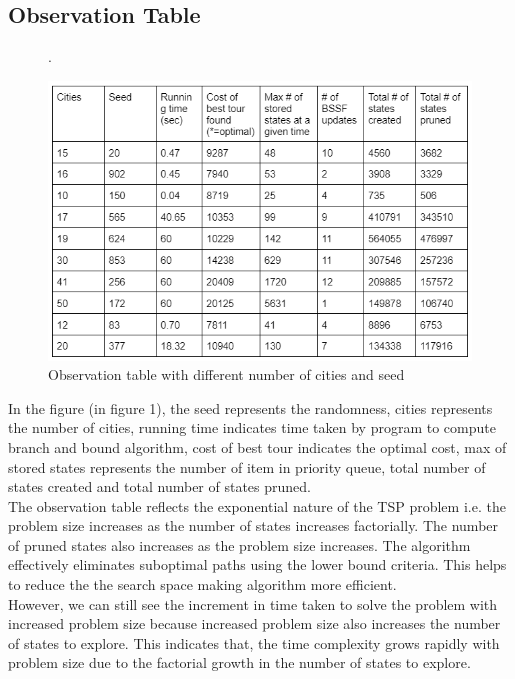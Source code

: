 \documentclass[12pt]{article}
\begin{document}
\subsection{Observation Table}
\begin{figure}[h]. %
    \begin{center}
      \includegraphics[width=0.90\linewidth]{figures/table.png} 
      \caption{Observation table with different number of cities and seed}\label{fig:table}
    \end{center}
  \end{figure}
\noindent In the figure (in figure 1), the seed represents the randomness, cities represents the number of cities, running time indicates time taken by program to compute branch and bound algorithm, cost of best tour indicates the optimal cost, 
max of stored states represents the number of item in priority queue, total number of states created and total number of states pruned. \\
The observation table reflects the exponential nature of the TSP problem i.e. the problem size increases as the number of states increases factorially. The number of 
pruned states also increases as the problem size increases. The algorithm effectively eliminates suboptimal paths using the lower bound criteria. This helps to reduce the 
the search space making algorithm more efficient.\\
However, we can still see the increment in time taken to solve the problem with increased problem size because increased problem size 
also increases the number of states to explore. This indicates that, the time complexity grows rapidly with problem size due to the factorial growth in the number of states to explore.
\end{document}
